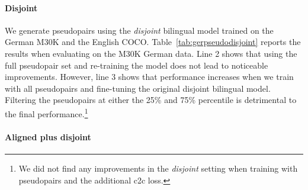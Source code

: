 \begin{comment}
We first train either 
the \emph{disjoint} (De+COCO) or the 
\emph{algined plus disjoint} (En+De+COCO) model 
and use it do generate pseudopairs creating a synthetic
German-COCO set:
for each sentence in COCO we retrieve the most similar 
German M30K
caption and label the COCO images with this new set of sentences.
We also investigate the effect of filtering the pseudopairs 
by training
on the full synthetic data set or only keeping
samples from the 75\% or 25\% percentiles. 
Lastly, we compare training our models from scratch 
with the added generated pseudopair set or 
continue training the "parent" model (fine-tune).
\end{comment}

\paragraph{Disjoint}

We generate pseudopairs using the 
\emph{disjoint} bilingual model trained on 
the German M30K and the English COCO.
Table~\ref{tab:gerpseudodisjoint} reports the results
when evaluating on the M30K German data.
Line 2 shows that using the full pseudopair set
and re-training the model does not lead to 
noticeable improvements. However, line 3 shows that performance increases when we train with all pseudopairs and fine-tuning the original disjoint bilingual model. Filtering the pseudopairs at either the 25\% and 75\% percentile is 
detrimental to the final performance.\footnote{
We did not find any improvements
in the \emph{disjoint} setting when training with pseudopairs and the additional c2c loss.}


\paragraph{Aligned plus disjoint}

